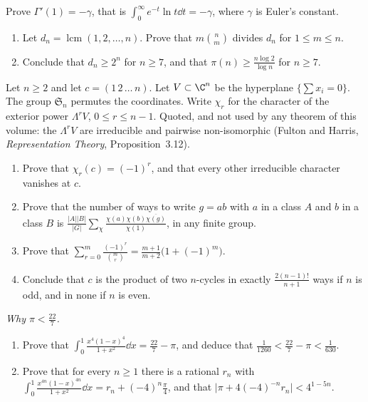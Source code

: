 \begin{exercise}[$\star\star\star$]\label{ex:digamma}
Prove $\Gamma'(1)=-\gamma$, that is $\int_0^\infty e^{-t}\ln t\dd t=-\gamma$, where $\gamma$ is Euler's constant.
\end{exercise}

\begin{exercise}[$\star\star$]\label{pb:nair}
\begin{enumerate}[label=(\alph*)]
\item Let $d_n=\operatorname{lcm}(1,2,\dots,n)$. Prove that $m\binom nm$ divides $d_n$ for $1\le m\le n$.
\item Conclude that $d_n\ge2^n$ for $n\ge7$, and that $\pi(n)\ge\frac{n\log2}{\log n}$ for $n\ge7$.
\end{enumerate}
\end{exercise}

\begin{exercise}[$\star\star\star$]\label{pb:ncycles}
Let $n\ge2$ and let $c=(1\,2\,\dots\,n)$. Let $V\subset\C^n$ be the hyperplane $\{\sum x_i=0\}$. The group $\mathfrak S_n$ permutes the coordinates. Write $\chi_r$ for the character of the exterior power $\Lambda^rV$, $0\le r\le n-1$. Quoted, and not used by any theorem of this volume: the
$\Lambda^rV$ are irreducible and pairwise non-isomorphic (Fulton and Harris, \emph{Representation Theory}, Proposition~3.12).
\begin{enumerate}[label=(\alph*)]
\item Prove that $\chi_r(c)=(-1)^r$, and that every other irreducible character vanishes at $c$.
\item Prove that the number of ways to write $g=ab$ with $a$ in a class $A$ and $b$ in a class $B$ is
$\frac{|A||B|}{|G|}\sum_\chi\frac{\chi(a)\chi(b)\overline{\chi(g)}}{\chi(1)}$, in any finite group.
\item Prove that $\sum_{r=0}^m\frac{(-1)^r}{\binom mr}=\frac{m+1}{m+2}\bigl(1+(-1)^m\bigr)$.
\item Conclude that $c$ is the product of two $n$-cycles in exactly $\frac{2(n-1)!}{n+1}$ ways if $n$ is odd, and in none if $n$ is
even.
\end{enumerate}
\end{exercise}

\begin{exercise}[$\star$]\label{pb:dalzell}
\emph{Why $\pi<\frac{22}7$.}
\begin{enumerate}[label=(\alph*)]
\item Prove that $\displaystyle\int_0^1\frac{x^4(1-x)^4}{1+x^2}\dd x=\frac{22}7-\pi$, and deduce that $\frac1{1260}<\frac{22}7-\pi<\frac1{630}$.
\item Prove that for every $n\ge1$ there is a rational $r_n$ with $\displaystyle\int_0^1\frac{x^{4n}(1-x)^{4n}}{1+x^2}\dd x=r_n+(-4)^n\frac\pi4$, and that
$\bigl|\pi+4(-4)^{-n}r_n\bigr|<4^{1-5n}$.
\end{enumerate}
\end{exercise}


